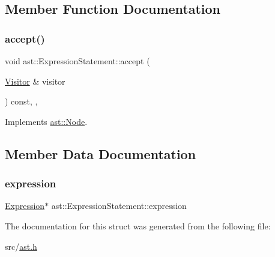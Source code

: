 \subsection{Member Function Documentation}
\mbox{\label{structast_1_1_expression_statement_ae1423385af60671e488b20ecbbc1f86e}} 
\subsubsection{\texorpdfstring{accept()}{accept()}}
{\footnotesize\ttfamily void ast\+::\+Expression\+Statement\+::accept (\begin{DoxyParamCaption}\item[{\hyperlink{structast_1_1_visitor}{Visitor} \&}]{visitor }\end{DoxyParamCaption}) const\hspace{0.3cm}{\ttfamily [inline]}, {\ttfamily [override]}, {\ttfamily [virtual]}}



Implements \hyperlink{structast_1_1_node_abc089ee6caaf06a4445ebdd8391fdebc}{ast\+::\+Node}.



\subsection{Member Data Documentation}
\mbox{\label{structast_1_1_expression_statement_a1829b79e8621555588c547173ae94c00}} 
\subsubsection{\texorpdfstring{expression}{expression}}
{\footnotesize\ttfamily \hyperlink{structast_1_1_expression}{Expression}$\ast$ ast\+::\+Expression\+Statement\+::expression}



The documentation for this struct was generated from the following file\+:\begin{DoxyCompactItemize}
\item 
src/\hyperlink{ast_8h}{ast.\+h}\end{DoxyCompactItemize}
